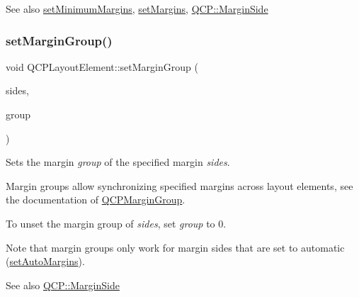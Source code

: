 \begin{DoxySeeAlso}{See also}
\mbox{\hyperlink{class_q_c_p_layout_element_a0a8a17abc16b7923159fcc7608f94673}{set\+Minimum\+Margins}}, \mbox{\hyperlink{class_q_c_p_layout_element_a8f450b1f3f992ad576fce2c63d8b79cf}{set\+Margins}}, \mbox{\hyperlink{namespace_q_c_p_a7e487e3e2ccb62ab7771065bab7cae54}{Q\+C\+P\+::\+Margin\+Side}} 
\end{DoxySeeAlso}
\mbox{\label{class_q_c_p_layout_element_a516e56f76b6bc100e8e71d329866847d}} 
\subsubsection{\texorpdfstring{set\+Margin\+Group()}{setMarginGroup()}}
{\footnotesize\ttfamily void Q\+C\+P\+Layout\+Element\+::set\+Margin\+Group (\begin{DoxyParamCaption}\item[{Q\+C\+P\+::\+Margin\+Sides}]{sides,  }\item[{\mbox{\hyperlink{class_q_c_p_margin_group}{Q\+C\+P\+Margin\+Group}} $\ast$}]{group }\end{DoxyParamCaption})}

Sets the margin {\itshape group} of the specified margin {\itshape sides}.

Margin groups allow synchronizing specified margins across layout elements, see the documentation of \mbox{\hyperlink{class_q_c_p_margin_group}{Q\+C\+P\+Margin\+Group}}.

To unset the margin group of {\itshape sides}, set {\itshape group} to 0.

Note that margin groups only work for margin sides that are set to automatic (\mbox{\hyperlink{class_q_c_p_layout_element_accfda49994e3e6d51ed14504abf9d27d}{set\+Auto\+Margins}}).

\begin{DoxySeeAlso}{See also}
\mbox{\hyperlink{namespace_q_c_p_a7e487e3e2ccb62ab7771065bab7cae54}{Q\+C\+P\+::\+Margin\+Side}} 
\end{DoxySeeAlso}
\mbox{\label{class_q_c_p_layout_element_a8f450b1f3f992ad576fce2c63d8b79cf}} 
